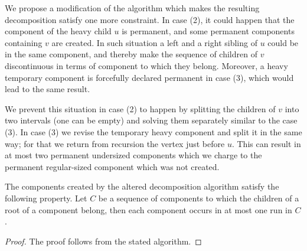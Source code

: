 \bigbreak

We propose a modification of the algorithm which makes the resulting decomposition satisfy one more constraint.
In case (2), it could happen that the component of the heavy child $u$ is permanent, and some permanent components containing $v$ are created.
In such situation a left and a right sibling of $u$ could be in the same component, and thereby make the sequence of children of $v$ discontinuous in terms of component to which they belong.
Moreover, a heavy temporary component is forcefully declared permanent in case (3), which would lead to the same result.

We prevent this situation in case (2) to happen by splitting the children of $v$ into two intervals (one can be empty) and solving them separately similar to the case (3).
In case (3) we revise the temporary heavy component and split it in the same way; for that we return from recursion the vertex just before $u$.
This can result in at most two permanent undersized components which we charge to the permanent regular-sized component which was not created.

\begin{lemma}\label{l:decompose-property}
	The components created by the altered decomposition algorithm satisfy the following property.
	Let $C$ be a sequence of components to which the children of a root of a component belong, then each component occurs in at most one run in $C$.
\end{lemma}
\begin{proof}
	The proof follows from the stated algorithm.
\end{proof}


